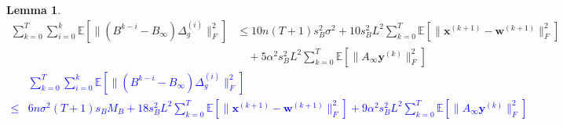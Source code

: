\documentclass{article}
\newtheorem{lemma}[thm]{Lemma}
\newcommand{\vw}{{\mathbf{w}}}
\newcommand{\vx}{{\mathbf{x}}}
\newcommand{\vy}{{\mathbf{y}}}
\newcommand{\EE}[1]{\mathbb{E}\left[#1\right]}
\newcommand{\norm}[1]{\| #1 \|}
\begin{document}
\begin{lemma}
  \begin{align*}
    \sum_{k=0}^{T}\sum_{i=0}^k \EE{\norm{(B^{k-i}-B_{\infty})\Delta_g^{(i)}}_F^2}&\le 10 n(T+1)s_B^2\sigma^2+10s_B^2L^2\sum_{k=0}^T\EE{\norm{\vx^{(k+1)}-\vw^{(k+1)}}_F^2}\\
    &\quad +5\alpha^2s_B^2L^2\sum_{k=0}^T\EE{\norm{A_{\infty}\vy^{(k)}}_F^2}
    \end{align*}
\textcolor{blue}{\begin{align*}
        &\sum_{k=0}^T\sum_{i=0}^k \EE{\norm{(B^{k-i}-B_{\infty})\Delta_g^{(i)}}_F^2}\\
        \leq& 6n\sigma^2(T+1)s_BM_B+18s_B^2L^2\sum_{k=0}^T\EE{\norm{\vx^{(k+1)}-\vw^{(k+1)}}_F^2}+9\alpha^2s_B^2L^2\sum_{k=0}^T\EE{\norm{A_{\infty}\vy^{(k)}}_F^2}
    \end{align*}}
\end{lemma}
\end{document}
